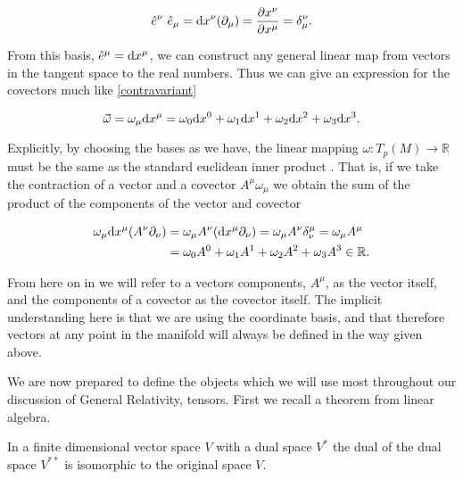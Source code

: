 \begin{equation} \label{cotangent-basis}
	\hat{e}^{\nu} \, \, \hat{e}_{\mu} = \text{d}x^{\nu} (\partial_{\mu}) = \frac{\partial x^{\nu}}{\partial x^{\mu}} = \delta^{\nu}_{\mu} .
\end{equation} 

From this basis, \(\hat{e}^{\mu} = \text{d}x^{\mu}\), we can construct any general linear map from vectors in the tangent space to the real numbers. Thus we can give an expression for the covectors much like \eqref{contravariant} \cite{carroll}

\begin{equation} \label{covarient}
	\vec{\omega} = \omega_{\mu} \text{d}x^{\mu} = \omega_0 \text{d}x^{0} + \omega_1 \text{d}x^{1} +\omega_2 \text{d}x^{2} +\omega_3 \text{d}x^{3} .
\end{equation} 

Explicitly, by choosing the bases as we have, the linear mapping \(\omega : T_{p} (M) \rightarrow \mathbb{R}\) must be the same as the standard euclidean inner product \cite{hartle}. That is, if we take the contraction of a vector and a covector \(A^{\mu} \omega_{\mu}\) we obtain the sum of the product of the components of the vector and covector \cite{hartle}

\begin{equation} \label{inner}
	\begin{aligned}
	\omega_{\mu} \text{d}x^{\mu} (A^{\nu} \partial_{\nu}) &= \omega_{\mu} A^{\nu} (\text{d}x^{\mu} \partial_{\nu}) = \omega_{\mu} A^{\nu} \delta^{\mu}_{\nu} = \omega_{\mu} A^{\mu} \\
	&= \omega_0 A^0 + \omega_1 A^1 + \omega_2 A^2 + \omega_3 A^3 \in \mathbb{R} .
	\end{aligned}
\end{equation} 

From here on in we will refer to a vectors components, \(A^{\mu}\), as the vector itself, and the components of a covector as the covector itself. The implicit understanding here is that we are using the coordinate basis, and that therefore vectors at any point in the manifold will always be defined in the way given above.

We are now prepared to define the objects which we will use most throughout our discussion of General Relativity, tensors. First we recall a theorem from linear algebra.

\begin{thm} \label{dual}
In a finite dimensional vector space \(V\) with a dual space \(V^{*}\) the dual of the dual space \(V^{**}\) is isomorphic to the original space \(V\). {\normalfont\cite{szekeres}}
\end{thm}

